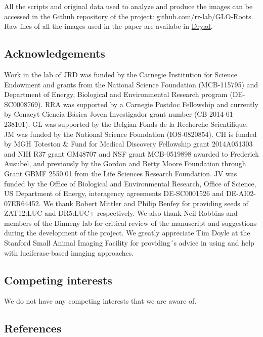 \documentclass[]{article}
\begin{document}
All the scripts and original data used to analyze and produce the images
can be accessed in the Github repository of the project:
github.com/rr-lab/GLO-Roots. Raw files of all the images used in the
paper are availabe in
\href{http://datadryad.org/review?doi=doi:10.5061/dryad.4k37q}{Dryad}.

\subsection{Acknowledgements}\label{acknowledgements}

Work in the lab of JRD was funded by the Carnegie Institution for
Science Endowment and grants from the National Science Foundation
(MCB-115795) and Department of Energy, Biological and Environmental
Research program (DE-SC0008769). RRA was supported by a Carnegie Postdoc
Fellowship and currently by Conacyt Ciencia Básica Joven Investigador
grant number (CB-2014-01-238101). GL was supported by the Belgian Fonds
de la Recherche Scientifique. JM was funded by the National Science
Foundation (IOS-0820854). CH is funded by MGH Toteston \& Fund for
Medical Discovery Fellowship grant 2014A051303 and NIH R37 grant GM48707
and NSF grant MCB-0519898 awarded to Frederick Ausubel, and previously
by the Gordon and Betty Moore Foundation through Grant GBMF 2550.01 from
the Life Sciences Research Foundation. JV was funded by the Office of
Biological and Environmental Research, Office of Science, US Department
of Energy, interagency agreements DE-SC0001526 and DE-AI02-07ER64452. We
thank Robert Mittler and Philip Benfey for providing seeds of ZAT12:LUC
and DR5:LUC+ respectively. We also thank Neil Robbins and members of the
Dinneny lab for critical review of the manuscript and suggestions during
the development of the project. We greatly appreciate Tim Doyle at the
Stanford Small Animal Imaging Facility for providing´s advice in using
and help with luciferase-based imaging approaches.

\subsection{Competing interests}\label{competing-interests}

We do not have any competing interests that we are aware of.

\pagebreak

\subsection*{References}\label{references}
\end{document}
